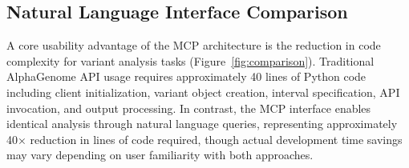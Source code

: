\documentclass[11pt]{article}
\begin{document}
\subsection{Natural Language Interface Comparison}

A core usability advantage of the MCP architecture is the reduction in code complexity for variant analysis tasks (Figure~\ref{fig:comparison}). Traditional AlphaGenome API usage requires approximately 40 lines of Python code including client initialization, variant object creation, interval specification, API invocation, and output processing. In contrast, the MCP interface enables identical analysis through natural language queries, representing approximately 40× reduction in lines of code required, though actual development time savings may vary depending on user familiarity with both approaches.
\end{document}
